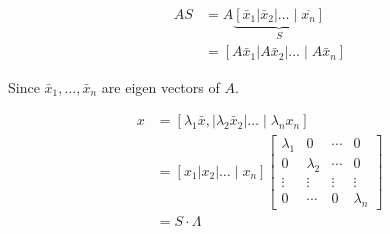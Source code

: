 \documentclass[main.tex]{subfiles}
\begin{document}
    $$
    \begin{aligned}
    A S &=A \underbrace{\left[\bar{x}_{1}\left|\bar{x}_{2}\right| \ldots \mid \overline{x_{n}}\right]}_{S} \\
    &=\left[A \bar{x}_{1}\left|A \bar{x}_{2}\right| \ldots \mid A \bar{x}_{n}\right]
    \end{aligned}
    $$
    
    Since $\bar{x}_{1}, \ldots, \bar{x}_{n}$ are eigen vectors of $A$.
    
    $$
    \begin{aligned}
    x &=\left[\lambda_{1} \bar{x},\left|\lambda_{2} \bar{x}_{2}\right| \ldots \mid \lambda_{n} x_{n}\right] \\
    &=\left[x_{1}\left|x_{2}\right| \ldots \mid x_{n}\right]
    \left[\begin{array}{llll}
    \lambda_{1} & 0 & \cdots & 0 \\
    0 & \lambda_{2} & \cdots & 0 \\
    \vdots & \vdots & \vdots & \vdots \\ 
    0 & \cdots & 0 & \lambda_{n}
    \end{array}\right] \\
    &= S \cdot \Lambda
    \end{aligned}
    $$
\end{document}
